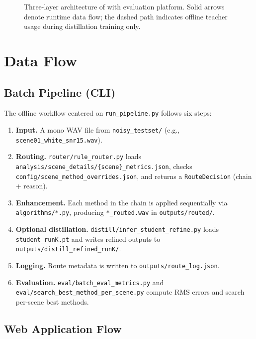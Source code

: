 \begin{figure}[H]
  \centering
  \resizebox{0.98\textwidth}{!}{%
  }
  \caption{Three-layer architecture of \projectshort{} with evaluation platform. Solid arrows denote runtime data flow; the dashed path indicates offline teacher usage during distillation training only.}
  \label{fig:system_architecture}
\end{figure}
\section{Data Flow}
\label{sec:data_flow}

\subsection{Batch Pipeline (CLI)}

The offline workflow centered on \texttt{run\_pipeline.py} follows six steps:

\begin{enumerate}
  \item \textbf{Input.} A mono WAV file from \texttt{noisy\_testset/} (e.g., \texttt{scene01\_white\_snr15.wav}).
  \item \textbf{Routing.} \texttt{router/rule\_router.py} loads \texttt{analysis/scene\_details/\{scene\}\_metrics.json}, checks \texttt{config/scene\_method\_overrides.json}, and returns a \texttt{RouteDecision} (chain + reason).
  \item \textbf{Enhancement.} Each method in the chain is applied sequentially via \texttt{algorithms/*.py}, producing \texttt{*\_routed.wav} in \texttt{outputs/routed/}.
  \item \textbf{Optional distillation.} \texttt{distill/infer\_student\_refine.py} loads \texttt{student\_runK.pt} and writes refined outputs to \texttt{outputs/distill\_refined\_runK/}.
  \item \textbf{Logging.} Route metadata is written to \texttt{outputs/route\_log.json}.
  \item \textbf{Evaluation.} \texttt{eval/batch\_eval\_metrics.py} and \texttt{eval/search\_best\_method\_per\_scene.py} compute RMS errors and search per-scene best methods.
\end{enumerate}

\subsection{Web Application Flow}

